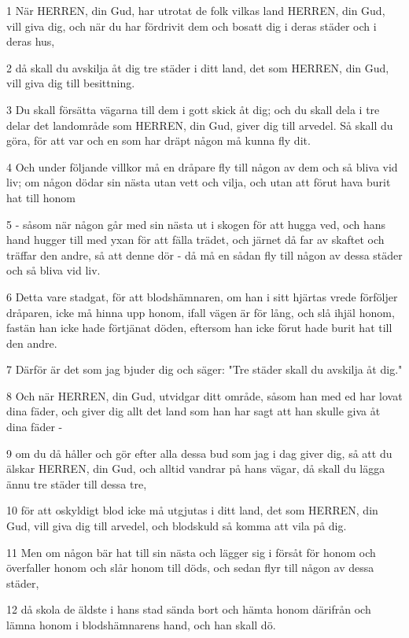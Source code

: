 \par 1 När HERREN, din Gud, har utrotat de folk vilkas land HERREN, din Gud, vill giva dig, och när du har fördrivit dem och bosatt dig i deras städer och i deras hus,
\par 2 då skall du avskilja åt dig tre städer i ditt land, det som HERREN, din Gud, vill giva dig till besittning.
\par 3 Du skall försätta vägarna till dem i gott skick åt dig; och du skall dela i tre delar det landområde som HERREN, din Gud, giver dig till arvedel. Så skall du göra, för att var och en som har dräpt någon må kunna fly dit.
\par 4 Och under följande villkor må en dråpare fly till någon av dem och så bliva vid liv; om någon dödar sin nästa utan vett och vilja, och utan att förut hava burit hat till honom
\par 5 - såsom när någon går med sin nästa ut i skogen för att hugga ved, och hans hand hugger till med yxan för att fälla trädet, och järnet då far av skaftet och träffar den andre, så att denne dör - då må en sådan fly till någon av dessa städer och så bliva vid liv.
\par 6 Detta vare stadgat, för att blodshämnaren, om han i sitt hjärtas vrede förföljer dråparen, icke må hinna upp honom, ifall vägen är för lång, och slå ihjäl honom, fastän han icke hade förtjänat döden, eftersom han icke förut hade burit hat till den andre.
\par 7 Därför är det som jag bjuder dig och säger: "Tre städer skall du avskilja åt dig."
\par 8 Och när HERREN, din Gud, utvidgar ditt område, såsom han med ed har lovat dina fäder, och giver dig allt det land som han har sagt att han skulle giva åt dina fäder -
\par 9 om du då håller och gör efter alla dessa bud som jag i dag giver dig, så att du älskar HERREN, din Gud, och alltid vandrar på hans vägar, då skall du lägga ännu tre städer till dessa tre,
\par 10 för att oskyldigt blod icke må utgjutas i ditt land, det som HERREN, din Gud, vill giva dig till arvedel, och blodskuld så komma att vila på dig.
\par 11 Men om någon bär hat till sin nästa och lägger sig i försåt för honom och överfaller honom och slår honom till döds, och sedan flyr till någon av dessa städer,
\par 12 då skola de äldste i hans stad sända bort och hämta honom därifrån och lämna honom i blodshämnarens hand, och han skall dö.
